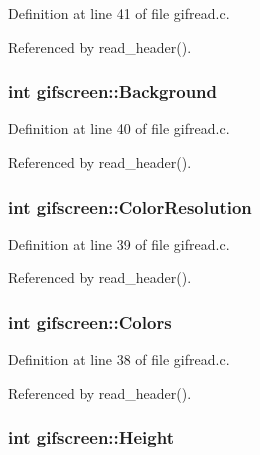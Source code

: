 Definition at line 41 of file gifread.\+c.



Referenced by read\+\_\+header().

\hypertarget{structgifscreen_aaeadb14e663211655fd7d2a160b288c0}{
\subsubsection[{Background}]{\setlength{\rightskip}{0pt plus 5cm}int gifscreen\+::\+Background}}\label{structgifscreen_aaeadb14e663211655fd7d2a160b288c0}


Definition at line 40 of file gifread.\+c.



Referenced by read\+\_\+header().

\hypertarget{structgifscreen_a207d54592bfe37394a84e98603d6936f}{
\subsubsection[{Color\+Resolution}]{\setlength{\rightskip}{0pt plus 5cm}int gifscreen\+::\+Color\+Resolution}}\label{structgifscreen_a207d54592bfe37394a84e98603d6936f}


Definition at line 39 of file gifread.\+c.



Referenced by read\+\_\+header().

\hypertarget{structgifscreen_aa0d1897afb3181c6ae9b2130b36ca8d9}{
\subsubsection[{Colors}]{\setlength{\rightskip}{0pt plus 5cm}int gifscreen\+::\+Colors}}\label{structgifscreen_aa0d1897afb3181c6ae9b2130b36ca8d9}


Definition at line 38 of file gifread.\+c.



Referenced by read\+\_\+header().

\hypertarget{structgifscreen_aa7f3a15b810a394cb1d01ac5d10d325b}{
\subsubsection[{Height}]{\setlength{\rightskip}{0pt plus 5cm}int gifscreen\+::\+Height}}\label{structgifscreen_aa7f3a15b810a394cb1d01ac5d10d325b}


